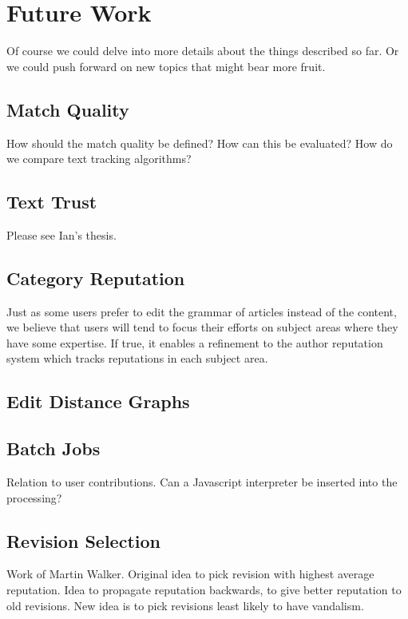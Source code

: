 \section{Future Work}

Of course we could delve into more details about
the things described so far.  Or we could push forward
on new topics that might bear more fruit.

\subsection{Match Quality}

How should the match quality be defined?  How can this be evaluated?
How do we compare text tracking algorithms?

\subsection{Text Trust}

Please see Ian's thesis.

\subsection{Category Reputation}

Just as some users prefer to edit the grammar of
articles instead of the content, we believe that
users will tend to focus their efforts on subject
areas where they have some expertise.
If true, it enables a refinement to the author
reputation system which tracks reputations in
each subject area.


\subsection{Edit Distance Graphs}

\subsection{Batch Jobs}

    Relation to user contributions.
    Can a Javascript interpreter be inserted into the processing?

\subsection{Revision Selection}

    Work of Martin Walker.
    Original idea to pick revision with highest average reputation.
    Idea to propagate reputation backwards, to give better reputation
    to old revisions.
    New idea is to pick revisions least likely to have vandalism.

